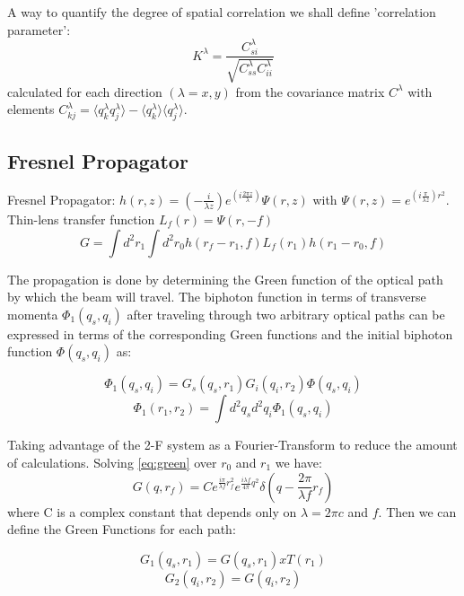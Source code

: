 A way to quantify the degree of spatial correlation we shall define 'correlation parameter':
\begin{equation}
K^\lambda = \frac{C^\lambda_{si}}{\sqrt{C^\lambda_{ss}C^\lambda_{ii}}}
\end{equation}
calculated for each direction $(\lambda = x, y)$ from the covariance matrix $C^\lambda$ with elements $C^\lambda_{kj} = \langle q^\lambda_k q^\lambda_j \rangle - \langle q^\lambda_k \rangle \langle q^\lambda_j \rangle $.


\subsection{Fresnel Propagator}
Fresnel Propagator: $h(r,z)=(- \frac{i}{\lambda z})e^{(i \frac{2 \pi z}{\lambda})} \Psi (r,z)$ 
with $\Psi(r,z) = e^{(i \frac{\pi}{\lambda z })r^2}$. Thin-lens transfer function $L_f (r)=\Psi(r,-f)$
 \\
\begin{equation}\label{eq:green}
G= \int d^2 r_1 \int d^2 r_0 h(r_f - r_1,f) L_f(r_1) h(r_1 - r_0,f)
\end{equation}

The propagation is done by determining the Green function of the optical path
by which the beam will travel. The biphoton function
in terms of transverse momenta $\Phi_1 (q_s , q_i )$ after traveling
through two arbitrary optical paths can be expressed
in terms of the corresponding Green functions and the
initial biphoton function $\Phi(q_s , q_i )$ as:

\begin{equation}
\Phi_1 (q_s , q_i )= G_s(q_s,r_1) G_i(q_i,r_2) \Phi (q_s,q_i) 
\end{equation}
\begin{equation}
\Phi_1 (r_1 , r_2 )= \int d^2 q_s d^2 q_i \Phi_1 (q_s , q_i ) 
\end{equation}

Taking advantage of the 2-F system as a Fourier-Transform to reduce the amount of calculations. Solving \ref{eq:green} over $r_0$ and $r_1$ we have:
\begin{equation}
G(q,r_f)=C e^{\frac{i \pi}{\lambda f} r_f^2} e^{\frac{i \lambda f}{4 \pi} q^2} \delta ( q - \frac{2 \pi}{\lambda f}r_f)
\end{equation}
where C is a complex constant that depends only on $\lambda = 2\pi c$ and $f$. Then we can define the Green Functions for each path:

\begin{equation}
G_1(q_s,r_1)=G(q_s,r_1) x T(r_1) 
\end{equation}
\begin{equation}
G_2(q_i,r_2)=G(q_i,r_2)
\end{equation}

